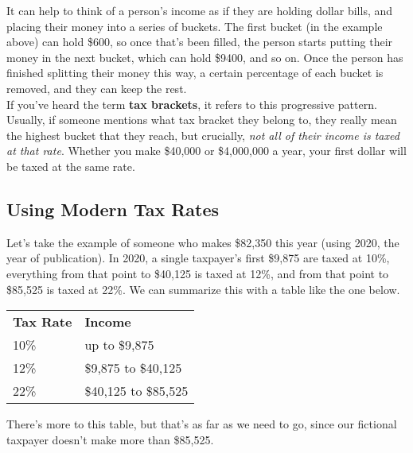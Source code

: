 It can help to think of a person's income as if they are holding dollar bills, and placing their money into a series of buckets.  The first bucket (in the example above) can hold \$600, so once that's been filled, the person starts putting their money in the next bucket, which can hold \$9400, and so on.  Once the person has finished splitting their money this way, a certain percentage of each bucket is removed, and they can keep the rest.\\

If you've heard the term \textbf{tax brackets}, it refers to this progressive pattern.  Usually, if someone mentions what tax bracket they belong to, they really mean the highest bucket that they reach, but crucially, \emph{not all of their income is taxed at that rate}.  Whether you make \$40,000 or \$4,000,000 a year, your first dollar will be taxed at the same rate.

\subsection{Using Modern Tax Rates}
Let's take the example of someone who makes \$82,350 this year (using 2020, the year of publication).  In 2020, a single taxpayer's first \$9,875 are taxed at 10\%, everything from that point to \$40,125 is taxed at 12\%, and from that point to \$85,525 is taxed at 22\%.  We can summarize this with a table like the one below.
\begin{center}
\begin{tabular}{l l}
\textbf{Tax Rate} & \textbf{Income}\\
10\% & up to \$9,875\\
12\% & \$9,875 to \$40,125\\
22\% & \$40,125 to \$85,525
\end{tabular}
\end{center}
There's more to this table, but that's as far as we need to go, since our fictional taxpayer doesn't make more than \$85,525.

